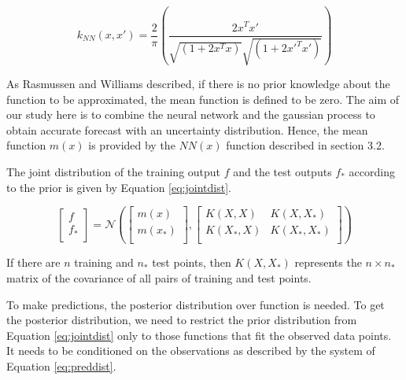 \begin{equation}\label{eq:gpcov}
 k_{NN} \left( x, x' \right) = \frac{2}{ \pi } \left( \frac{2x^{T}x'}{\sqrt{ \left( 1+2x^{T} x \right) }\sqrt{ \left( 1+2x'^{T}x' \right)}} \right)
\end{equation}


As Rasmussen and Williams \cite{Rasmussen:2005:GPM:1162254} described, if there is no prior knowledge about 
the function to be approximated, the mean function is defined to be zero. The aim of our study here is to 
combine the neural network and the gaussian process to obtain accurate forecast with an uncertainty distribution. 
Hence, the mean function  \( m \left( x \right)  \)  is provided by the  \( NN \left( x \right)  \)  function 
described in section 3.2.


The joint distribution of the training output  \( f \)  and the test outputs  \( f_{\ast} \)  according to the 
prior is given by Equation \ref{eq:jointdist}. 

\begin{equation}\label{eq:jointdist}
  \left[ \begin{array}{ll}
	f\\
	f_{\ast}\\
	\end{array} \right] = \mathcal{N}   \left(  \left[ \begin{array}{ll}
	m \left( x \right) \\
	m \left( x_{\ast} \right) \\
	\end{array} \right] ,  \left[ \begin{matrix}
K \left( X,X \right)   &  K \left( X,X_{\ast} \right) \\
K \left( X_{\ast},X \right)   &  K \left( X_{\ast},X_{\ast} \right) \\
\end{matrix}
 \right]  \right) 
\end{equation}


If there are  \( n \)  training and  \( n_{\ast} \)  test points, then  \( K \left( X,X_{\ast} \right)  \)  
represents the  \( n \times n_{\ast} \)  matrix of the covariance of all pairs of training and test points. 



To make predictions, the posterior distribution over function is needed. To get the posterior distribution, 
we need to restrict the prior distribution from Equation \ref{eq:jointdist} only to those functions that 
fit the observed data points. It needs to be conditioned on the observations as described by 
the system of Equation \ref{eq:preddist}.



